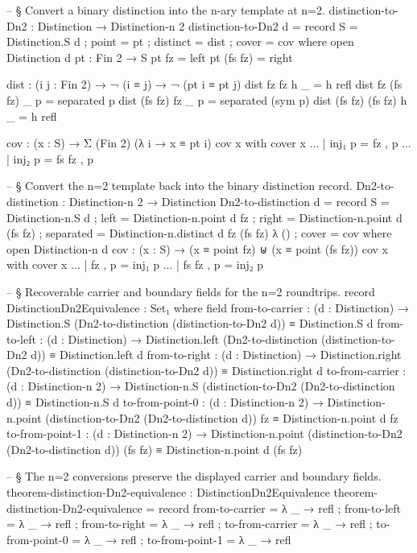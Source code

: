 \documentclass[11pt]{article}
\begin{document}
\begin{code}
-- § Convert a binary distinction into the n-ary template at n=2.
distinction-to-Dn2 : Distinction → Distinction-n 2
distinction-to-Dn2 d = record
  { S        = Distinction.S d
  ; point    = pt
  ; distinct = dist
  ; cover    = cov
  }
  where
    open Distinction d
    pt : Fin 2 → S
    pt fz      = left
    pt (fs fz) = right

    dist : (i j : Fin 2) → ¬ (i ≡ j) → ¬ (pt i ≡ pt j)
    dist fz      fz      h _ = h refl
    dist fz      (fs fz) _ p = separated p
    dist (fs fz) fz      _ p = separated (sym p)
    dist (fs fz) (fs fz) h _ = h refl

    cov : (x : S) → Σ (Fin 2) (λ i → x ≡ pt i)
    cov x with cover x
    ... | inj₁ p = fz , p
    ... | inj₂ p = fs fz , p

  -- § Convert the n=2 template back into the binary distinction record.
Dn2-to-distinction : Distinction-n 2 → Distinction
Dn2-to-distinction d = record
  { S         = Distinction-n.S d
  ; left      = Distinction-n.point d fz
  ; right     = Distinction-n.point d (fs fz)
  ; separated = Distinction-n.distinct d fz (fs fz) λ ()
  ; cover     = cov
  }
  where
    open Distinction-n d
    cov : (x : S) → (x ≡ point fz) ⊎ (x ≡ point (fs fz))
    cov x with cover x
    ... | fz , p    = inj₁ p
    ... | fs fz , p = inj₂ p

-- § Recoverable carrier and boundary fields for the n=2 roundtrips.
record DistinctionDn2Equivalence : Set₁ where
  field
    from-to-carrier   : (d : Distinction) →
      Distinction.S (Dn2-to-distinction (distinction-to-Dn2 d)) ≡ Distinction.S d
    from-to-left      : (d : Distinction) →
      Distinction.left (Dn2-to-distinction (distinction-to-Dn2 d)) ≡ Distinction.left d
    from-to-right     : (d : Distinction) →
      Distinction.right (Dn2-to-distinction (distinction-to-Dn2 d)) ≡ Distinction.right d
    to-from-carrier   : (d : Distinction-n 2) →
      Distinction-n.S (distinction-to-Dn2 (Dn2-to-distinction d)) ≡ Distinction-n.S d
    to-from-point-0   : (d : Distinction-n 2) →
      Distinction-n.point (distinction-to-Dn2 (Dn2-to-distinction d)) fz ≡ Distinction-n.point d fz
    to-from-point-1   : (d : Distinction-n 2) →
      Distinction-n.point (distinction-to-Dn2 (Dn2-to-distinction d)) (fs fz) ≡ Distinction-n.point d (fs fz)

    -- § The n=2 conversions preserve the displayed carrier and boundary fields.
theorem-distinction-Dn2-equivalence : DistinctionDn2Equivalence
theorem-distinction-Dn2-equivalence = record
  { from-to-carrier = λ _ → refl
  ; from-to-left    = λ _ → refl
  ; from-to-right   = λ _ → refl
  ; to-from-carrier = λ _ → refl
  ; to-from-point-0 = λ _ → refl
  ; to-from-point-1 = λ _ → refl
  }
\end{code}
\end{document}
